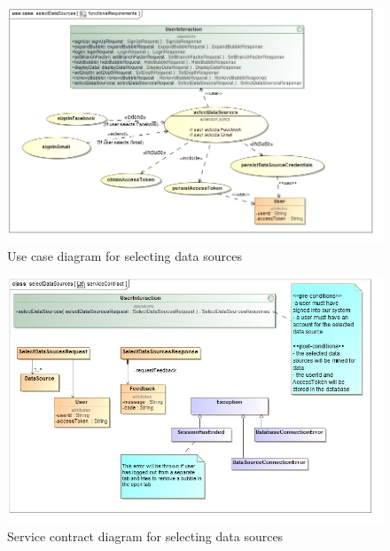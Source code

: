 \documentclass[hidelinks,english]{article}
\begin{document}
    			\begin{figure}[!h]
    			\includegraphics[width=\linewidth]{functionalRequirementsSelectDataSources.jpg}
    			\caption{Use case diagram for selecting data sources}
    			\label{UseCaseSelectDataSources}
    			\end{figure}
    			
    			\begin{figure}[!h]
    			\includegraphics[width=\linewidth]{serviceContractSelectDataSources.jpg}
    			\caption{Service contract diagram for selecting data sources}
    			\label{ServiceContractSelectDataSources}
    			\end{figure}
    			
    			
    			
\end{document}
